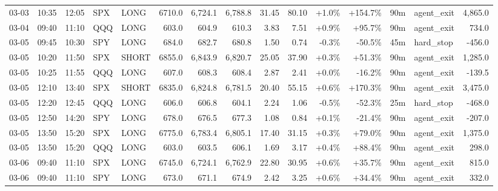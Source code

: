 \documentclass[11pt,a4paper,twoside]{article}
\begin{document}
\begin{landscape}
\begin{center}
\begin{longtable}{>{\color{txtmain}}l l l l l r r r r r r r r >{\color{txtmain}}l r}
03-03 & 10:35 & 12:05 & SPX & LONG & 6710.0 & 6,724.1 & 6,788.8 & 31.45 & 80.10 & \textcolor{wingreen}{+1.0\%} & \textcolor{wingreen}{+154.7\%} & 90m & agent\_exit & \textcolor{wingreen}{4,865.0} \\
03-04 & 09:40 & 11:10 & QQQ & LONG & 603.0 & 604.9 & 610.3 & 3.83 & 7.51 & \textcolor{wingreen}{+0.9\%} & \textcolor{wingreen}{+95.7\%} & 90m & agent\_exit & \textcolor{wingreen}{734.0} \\
03-05 & 09:45 & 10:30 & SPY & LONG & 684.0 & 682.7 & 680.8 & 1.50 & 0.74 & \textcolor{lossred}{-0.3\%} & \textcolor{lossred}{-50.5\%} & 45m & hard\_stop & \textcolor{lossred}{-456.0} \\
03-05 & 10:20 & 11:50 & SPX & SHORT & 6855.0 & 6,843.9 & 6,820.7 & 25.05 & 37.90 & \textcolor{wingreen}{+0.3\%} & \textcolor{wingreen}{+51.3\%} & 90m & agent\_exit & \textcolor{wingreen}{1,285.0} \\
03-05 & 10:25 & 11:55 & QQQ & LONG & 607.0 & 608.3 & 608.4 & 2.87 & 2.41 & \textcolor{wingreen}{+0.0\%} & \textcolor{lossred}{-16.2\%} & 90m & agent\_exit & \textcolor{lossred}{-139.5} \\
03-05 & 12:10 & 13:40 & SPX & SHORT & 6835.0 & 6,824.8 & 6,781.5 & 20.40 & 55.15 & \textcolor{wingreen}{+0.6\%} & \textcolor{wingreen}{+170.3\%} & 90m & agent\_exit & \textcolor{wingreen}{3,475.0} \\
03-05 & 12:20 & 12:45 & QQQ & LONG & 606.0 & 606.8 & 604.1 & 2.24 & 1.06 & \textcolor{lossred}{-0.5\%} & \textcolor{lossred}{-52.3\%} & 25m & hard\_stop & \textcolor{lossred}{-468.0} \\
03-05 & 12:50 & 14:20 & SPY & LONG & 678.0 & 676.5 & 677.3 & 1.08 & 0.84 & \textcolor{wingreen}{+0.1\%} & \textcolor{lossred}{-21.4\%} & 90m & agent\_exit & \textcolor{lossred}{-207.0} \\
03-05 & 13:50 & 15:20 & SPX & LONG & 6775.0 & 6,783.4 & 6,805.1 & 17.40 & 31.15 & \textcolor{wingreen}{+0.3\%} & \textcolor{wingreen}{+79.0\%} & 90m & agent\_exit & \textcolor{wingreen}{1,375.0} \\
03-05 & 13:50 & 15:20 & QQQ & LONG & 603.0 & 603.5 & 606.1 & 1.69 & 3.17 & \textcolor{wingreen}{+0.4\%} & \textcolor{wingreen}{+88.4\%} & 90m & agent\_exit & \textcolor{wingreen}{298.0} \\
03-06 & 09:40 & 11:10 & SPX & LONG & 6745.0 & 6,724.1 & 6,762.9 & 22.80 & 30.95 & \textcolor{wingreen}{+0.6\%} & \textcolor{wingreen}{+35.7\%} & 90m & agent\_exit & \textcolor{wingreen}{815.0} \\
03-06 & 09:40 & 11:10 & SPY & LONG & 673.0 & 671.1 & 674.9 & 2.42 & 3.25 & \textcolor{wingreen}{+0.6\%} & \textcolor{wingreen}{+34.4\%} & 90m & agent\_exit & \textcolor{wingreen}{332.0} \\

\end{longtable}
\end{center}
\end{landscape}
\end{document}
